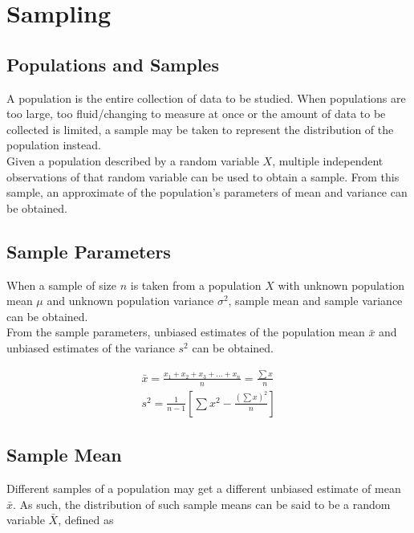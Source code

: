 \documentclass[../main]{subfiles}
\begin{document}
\section{Sampling}

	\subsection{Populations and Samples}

	A population is the entire collection of data to be studied. When populations are too large, too fluid/changing to measure at once or the amount of data to be collected is limited, a sample may be taken to represent the distribution of the population instead. \\

	Given a population described by a random variable \(X\), multiple independent observations of that random variable can be used to obtain a sample. From this sample, an approximate of the population's parameters of mean and variance can be obtained. \\

	\subsection{Sample Parameters}

	When a sample of size \(n\) is taken from a population \(X\) with unknown population mean \(\mu\) and unknown population variance \(\sigma^2\), sample mean and sample variance can be obtained. \\

	From the sample parameters, unbiased estimates of the population mean \(\bar{x}\) and unbiased estimates of the variance \(s^2\) can be obtained.

	\begin{equation*} \begin{gathered}
		\bar{x} = \frac{x_1 + x_2 + x_3 + \dots + x_n}{n} = \frac{\sum x}{n} \\
		s^2 = \frac{1}{n-1} \left[ \sum x^2 - \frac{(\sum x)^2}{n} \right]
	\end{gathered} \end{equation*}

	\subsection{Sample Mean}

	Different samples of a population may get a different unbiased estimate of mean \(\bar{x}\). As such, the distribution of such sample means can be said to be a random variable \(\bar{X}\), defined as
\end{document}

